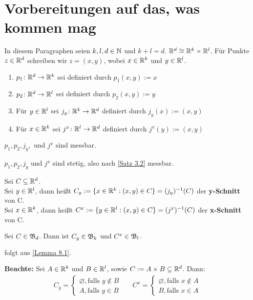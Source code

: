 \documentclass[a4paper,twoside,DIV15,BCOR12mm,chapterprefix=true,headings=onelinechapter]{scrbook}
\begin{document}
\chapter{Vorbereitungen auf das, was kommen mag}
In diesem Paragraphen seien \(k,l,d\in\mathbb{N}\) und \(k+l=d\). \(\mathbb{R}^d\cong\mathbb{R}^k\times\mathbb{R}^l\). Für Punkte \(z\in\mathbb{R}^d\) schreiben wir \(z=(x,y)\), wobei \(x\in\mathbb{R}^k\) und \(y\in\mathbb{R}^l\).

\begin{definition}
\begin{enumerate}
	\item 	\(p_1\colon\mathbb{R}^d\to\mathbb{R}^k\) sei definiert durch \(p_1(x,y):=x\)
	\item 	\(p_2\colon\mathbb{R}^d\to\mathbb{R}^l\) sei definiert durch \(p_2(x,y):=y\)
	\item 	Für \(y\in\mathbb{R}^l\) sei \(j_y\colon\mathbb{R}^k\to\mathbb{R}^d\) definiert durch \(j_y(x):=(x,y)\)
	\item 	Für \(x\in\mathbb{R}^k\) sei \(j^x\colon\mathbb{R}^l\to\mathbb{R}^d\) definiert durch \(j^x(y):=(x,y)\)
\end{enumerate}
\end{definition}

\begin{lemma}
\label{Lemma 8.1}
\(p_1,p_2,j_y,\) und \(j^x\) sind messbar.
\end{lemma}

\begin{beweis}
\(p_1,p_2,j_y\) und \(j^x\) sind stetig, also nach \ref{Satz 3.2} messbar.
\end{beweis}

\begin{definition}
Sei \(C\subseteq\mathbb{R}^d\).\\
Sei \(y\in\mathbb{R}^l\), dann heißt \(C_y:=\{x\in\mathbb{R}^k:(x,y)\in C\}=(j_y)^{-1}(C)\) der \textbf{y-Schnitt} von C.\\
Sei \(x\in\mathbb{R}^k\), dann heißt \(C^x:=\{y\in\mathbb{R}^l:(x,y)\in C\}=(j^x)^{-1}(C)\) der \textbf{x-Schnitt} von C.
\end{definition}

\begin{lemma}
\label{Lemma 8.2}
Sei \(C\in\mathfrak{B}_d\). Dann ist \(C_y\in\mathfrak{B}_k\) und \(C^x\in\mathfrak{B}_l\).
\end{lemma}

\begin{beweis}
folgt aus \ref{Lemma 8.1}.
\end{beweis}

\textbf{Beachte: } Sei \(A\in\mathbb{R}^k\) und \(B\in\mathbb{R}^l\), sowie \(C:=A\times B \subseteq\mathbb{R}^d\). Dann:
\begin{align*}
C_y=	\begin{cases}
		{\varnothing, 	\text{falls } y\notin B}\\
		{A,		\text{falls } y\in B}
	 \end{cases}
&
&C^x=\begin{cases}
		{\varnothing, 	\text{falls } x\notin A}\\
		{B,		\text{falls } x\in A}
	 \end{cases}
\end{align*}	
\end{document}
